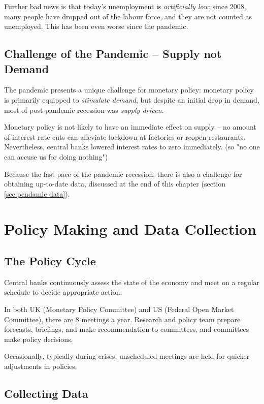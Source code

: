         Further bad news is that today's unemployment is \emph{artificially low}: since 2008, many people have dropped out of the labour force, and they are not counted as unemployed. This has been even worse since the pandemic.

    \subsection{Challenge of the Pandemic -- Supply not Demand}

        The pandemic presents a unique challenge for monetary policy: monetary policy is primarily equipped to \emph{stimulate demand}, but despite an initial drop in demand, most of post-pandemic recession was \emph{supply driven}.

        Monetary policy is not likely to have an immediate effect on supply -- no amount of interest rate cuts can alleviate lockdown at factories or reopen restaurants. Nevertheless, central banks lowered interest rates to zero immediately. (so "no one can accuse us for doing nothing")

        Because the fast pace of the pandemic recession, there is also a challenge for obtaining up-to-date data, discussed at the end of this chapter (section \ref{sec:pendamic data}).

\section{Policy Making and Data Collection}

    \subsection{The Policy Cycle}

        Central banks continuously assess the state of the economy and meet on a regular schedule to decide appropriate action.

        In both UK (Monetary Policy Committee) and US (Federal Open Market Committee), there are 8 meetings a year. Research and policy team prepare forecasts, briefings, and make recommendation to committees, and committees make policy decisions.

        Occasionally, typically during crises, unscheduled meetings are held for quicker adjustments in policies.
        
    \subsection{Collecting Data}

